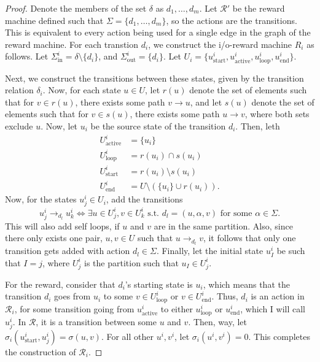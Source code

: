 \documentclass[11pt]{article}
\begin{document}
\begin{proof}
    Denote the members of the set $\delta$ as $d_1, \ldots, d_m$.
    Let $\mathcal{R}'$ be the reward machine defined such that $\Sigma = \{d_1, \ldots, d_m\}$, so the actions are the transitions. This is equivalent to every action being used for a single edge in the graph of the reward machine.
    For each transtion $d_i$, we construct the i/o-reward machine $R_i$ as follows.
    Let $\Sigma^{i}_{\text{in}} = \delta \setminus \{d_i\}$, and $\Sigma^{i}_{\text{out}} = \{d_i\}$.
    Let $U_i = \{u^i_{\text{start}}, u^i_{\text{active}}, u^i_{\text{loop}}, u^i_{\text{end}}\}$.
    
    Next, we construct the transitions between these states, given by the transition relation $\delta_i$.
    Now, for each state $u \in U$, let $r(u)$ denote the set of elements such that for $v \in r(u)$, there exists some path $v \to u$, and let $s(u)$ denote the set of elements such that for $v \in s(u)$, there exists some path $u \to v$, where both sets exclude $u$.
    Now, let $u_{i}$ be the source state of the transition $d_i$.
    Then, leth
    \begin{align*}
        U^{i}_{\text{active}} &= \{u_i\}\\
        U^{i}_{\text{loop}} &= r(u_i) \cap s(u_i)\\
        U^{i}_{\text{start}} &=  r(u_i) \setminus s(u_i) \\
        U^{i}_{\text{end}} &= U \setminus (\{u_i\} \cup r(u_i))
    .\end{align*}
    Now, for the states $u^i_j \in U_i$, add the transitions
    \[
    u^{i}_j \to_{d_l} u^{i}_{k} \iff \exists u \in U^{i}_j, v \in U^{i}_k \text{ s.t. } d_l = (u, \alpha, v) \text{ for some } \alpha \in \Sigma
    .\] 
    This will also add self loops, if $u$ and $v$ are in the same partition.
    Also, since there only exists one pair, $u, v \in U$ such that $u \to_{d_l} v$, it follows that only one transition gets added with action $d_l \in \Sigma$.
    Finally, let the initial state $u_I^{i}$ be such that $I = j$, where $U^{i}_j$ is the partition such that $u_I \in U^{i}_j$.
    
    For the reward, consider that $d_i$'s starting state is $u_i$, which means that the transition $d_i$ goes from $u_i$ to some $v \in U^{i}_{\text{loop}}$ or $v \in U^{i}_{\text{end}}$.
    Thus, $d_i$ is an action in $\mathcal{R}_{i}$, for some transition going from $u^{i}_{\text{active}}$ to either $u^{i}_{\text{loop}}$ or $u^{i}_{\text{end}}$, which I will call $u^{i}_j$. In $\mathcal{R}$, it is a transition between some $u$ and $v$.
    Then, way, let $\sigma_{i}(u^{i}_{\text{start}}, u^{i}_j) = \sigma(u, v)$.
    For all other $u^i, v^i$, let $\sigma_{i}(u^i, v^i) = 0$.
    This completes the construction of $\mathcal{R}_{i}$.


\end{proof}
\end{document}
